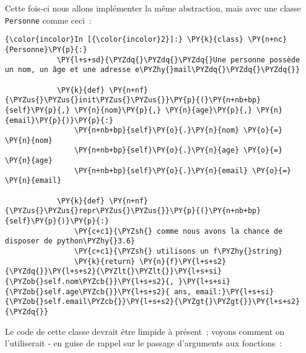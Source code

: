     Cette fois-ci nous allons implémenter la même abstraction, mais avec une
classe \texttt{Personne} comme ceci~:

    \begin{Verbatim}[commandchars=\\\{\},frame=single,framerule=0.3mm,rulecolor=\color{cellframecolor}]
{\color{incolor}In [{\color{incolor}2}]:} \PY{k}{class} \PY{n+nc}{Personne}\PY{p}{:}
            \PY{l+s+sd}{\PYZdq{}\PYZdq{}\PYZdq{}Une personne possède un nom, un âge et une adresse e\PYZhy{}mail\PYZdq{}\PYZdq{}\PYZdq{}}
            
            \PY{k}{def} \PY{n+nf}{\PYZus{}\PYZus{}init\PYZus{}\PYZus{}}\PY{p}{(}\PY{n+nb+bp}{self}\PY{p}{,} \PY{n}{nom}\PY{p}{,} \PY{n}{age}\PY{p}{,} \PY{n}{email}\PY{p}{)}\PY{p}{:}
                \PY{n+nb+bp}{self}\PY{o}{.}\PY{n}{nom} \PY{o}{=} \PY{n}{nom}
                \PY{n+nb+bp}{self}\PY{o}{.}\PY{n}{age} \PY{o}{=} \PY{n}{age}
                \PY{n+nb+bp}{self}\PY{o}{.}\PY{n}{email} \PY{o}{=} \PY{n}{email}
                
            \PY{k}{def} \PY{n+nf}{\PYZus{}\PYZus{}repr\PYZus{}\PYZus{}}\PY{p}{(}\PY{n+nb+bp}{self}\PY{p}{)}\PY{p}{:}
                \PY{c+c1}{\PYZsh{} comme nous avons la chance de disposer de python\PYZhy{}3.6}
                \PY{c+c1}{\PYZsh{} utilisons un f\PYZhy{}string}
                \PY{k}{return} \PY{n}{f}\PY{l+s+s2}{\PYZdq{}}\PY{l+s+s2}{\PYZlt{}\PYZlt{}}\PY{l+s+si}{\PYZob{}self.nom\PYZcb{}}\PY{l+s+s2}{, }\PY{l+s+si}{\PYZob{}self.age\PYZcb{}}\PY{l+s+s2}{ ans, email:}\PY{l+s+si}{\PYZob{}self.email\PYZcb{}}\PY{l+s+s2}{\PYZgt{}\PYZgt{}}\PY{l+s+s2}{\PYZdq{}}
\end{Verbatim}


    Le code de cette classe devrait être limpide à présent~; voyons comment
on l'utiliserait - en guise de rappel sur le passage d'arguments aux
fonctions~:


